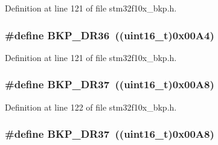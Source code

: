 Definition at line 121 of file stm32f10x\+\_\+bkp.\+h.

\subsubsection[{\texorpdfstring{B\+K\+P\+\_\+\+D\+R36}{BKP_DR36}}]{\setlength{\rightskip}{0pt plus 5cm}\#define B\+K\+P\+\_\+\+D\+R36~(({\bf uint16\+\_\+t})0x00\+A4)}\hypertarget{group___data___backup___register_ga212028eb8d981756b3bc78492434d19a}{}\label{group___data___backup___register_ga212028eb8d981756b3bc78492434d19a}


Definition at line 121 of file stm32f10x\+\_\+bkp.\+h.

\subsubsection[{\texorpdfstring{B\+K\+P\+\_\+\+D\+R37}{BKP_DR37}}]{\setlength{\rightskip}{0pt plus 5cm}\#define B\+K\+P\+\_\+\+D\+R37~(({\bf uint16\+\_\+t})0x00\+A8)}\hypertarget{group___data___backup___register_ga6c11b636a33c5b352d267355e502b34d}{}\label{group___data___backup___register_ga6c11b636a33c5b352d267355e502b34d}


Definition at line 122 of file stm32f10x\+\_\+bkp.\+h.

\subsubsection[{\texorpdfstring{B\+K\+P\+\_\+\+D\+R37}{BKP_DR37}}]{\setlength{\rightskip}{0pt plus 5cm}\#define B\+K\+P\+\_\+\+D\+R37~(({\bf uint16\+\_\+t})0x00\+A8)}\hypertarget{group___data___backup___register_ga6c11b636a33c5b352d267355e502b34d}{}\label{group___data___backup___register_ga6c11b636a33c5b352d267355e502b34d}


